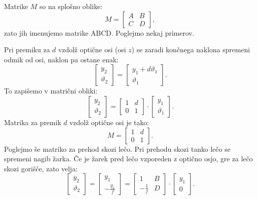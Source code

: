 Matrike $M$ so na splošno oblike:
\begin{equation}
M = \left[\begin{array}{cc}
A & B\\
C & D
\end{array}\right]\!\!,
\label{eq:ABCDdef}
\end{equation}
zato jih imenujemo matrike ABCD. Poglejmo nekaj primerov. 

Pri premiku za $d$ vzdolž optične osi (osi $z$) se zaradi končnega naklona 
spremeni odmik od osi, naklon pa ostane enak:
\begin{equation}
\left[\begin{array}{c}
y_{2}\\
\vartheta_{2}
\end{array}\right]=\left[\begin{array}{c}
y_{1}+d\vartheta_{1}\\
\vartheta_{1}
\end{array}\right]\!\!.
\end{equation}
To zapišemo v matrični obliki:
\begin{equation}
\left[\begin{array}{c}
y_{2}\\
\vartheta_{2}
\end{array}\right]=\left[\begin{array}{cc}
1 & d\\
0 & 1
\end{array}\right]\cdot\left[\begin{array}{c}
y_{1}\\
\vartheta_{1}
\end{array}\right]\!\!.
\end{equation}
Matrika za premik $d$ vzdolž optične osi je tako:
\begin{equation}
M= \left[\begin{array}{cc}
1 & d\\
0 & 1
\end{array}\right]\!\!.
\label{eq:MABCD1}
\end{equation}
Poglejmo še matriko za prehod skozi lečo. 
Pri prehodu skozi tanko lečo se spremeni nagib žarka. Če je žarek pred
lečo vzporeden z optično osjo, gre za lečo skozi gorišče, zato velja:
\begin{equation}
\left[\begin{array}{c}
y_{2}\\
\vartheta_{2}
\end{array}\right]=\left[\begin{array}{c}
y_{1}\\
-\frac{y_{1}}{f}
\end{array}\right]=\left[\begin{array}{cc}
1 & B\\
-\frac{1}{f} & D
\end{array}\right]\cdot\left[\begin{array}{c}
y_{1}\\
0
\end{array}\right]\!\!.
\end{equation}
